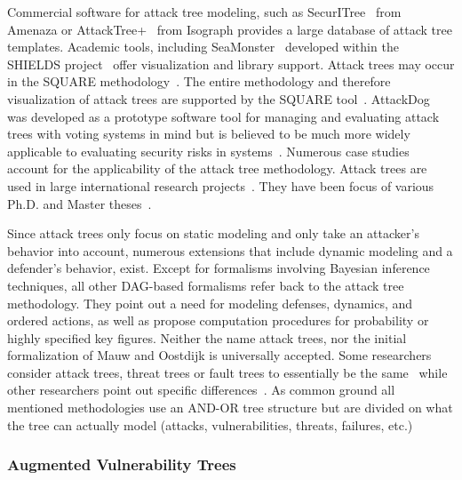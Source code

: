 \documentclass[a4paper]{article}
\begin{document}
Commercial software for attack tree modeling, such as
SecurITree~\cite{Program1} from Amenaza or AttackTree+~\cite{Program2} from
Isograph provides a large database of attack tree templates. Academic tools,
including SeaMonster~\cite{Program6} developed within the SHIELDS
project~\cite{Website_SHIELDS} offer visualization and library support. Attack
trees may occur in the SQUARE methodology~\cite{MeHoSt}. The entire methodology 
and therefore visualization of attack trees are supported by the SQUARE
tool~\cite{Website_Square_Tool}. AttackDog~\cite{Program3} was developed as a
prototype software tool for managing and evaluating attack trees with voting
systems in mind but is believed to be much more widely applicable to evaluating
security risks in systems~\cite{Accurate_Annual_Report}. Numerous case studies
\cite{MoElLi,TiLaFiHa,ByFrMi,CoCoFr,EvHeKyPiWa,HiUnJaSaLu,BuPaUnPaWaSa,FuChWaLeTaAnLi,MeHoSt,AiBoDoFeGeKrLe,KhSe,TeLiGo,ClSiTyHa,GrJo,Mars,NiXiYoSi,PaLeChKiLeKw,ReVeOlCu,SaDuPa,HeApFuRoRuWe,LiZaRuLi,MoMaCaJi,CaKiKi,FeBaMoJi,LaPoDa,LaPoMiDeDa,TeMaLi,EoPaPaCh,LaDiEpHa,MoCaMa,SaWoXu,WaLeRo,SuSv,ZhYu}
account for the applicability of the attack tree methodology. Attack trees are
used in large international research
projects~\cite{Website_EVITA,Website_SHIELDS,trespass,Nucl}.
They have been focus of various Ph.D. and 
Master theses~\cite{Kien,Pumf,Mobe,Fost,Sche,Opel,Karp,Edge,Espe,Hogg,Magi,Harr,Jurg,Piet,Roy,Niel,Ostl,Sameer,Zonouz,Buon,Koot,Pose}.

Since attack trees only focus on static modeling and only take an attacker's
behavior into account, numerous extensions that include dynamic modeling and a
defender's behavior, exist. Except for formalisms involving Bayesian inference
techniques, all other DAG-based formalisms refer back to the attack tree 
methodology.  They point out a need for modeling defenses, dynamics, and ordered
actions,  as well as  propose computation procedures for probability or highly
specified key figures. Neither the name attack trees, nor the initial
formalization of Mauw and Oostdijk is universally accepted. Some researchers
consider attack trees,  threat trees or fault trees to essentially be the 
same~\cite{Lams,MoYa,SoEkNo,Andefirst,Ingo,StSc} while other researchers point 
out specific differences~\cite{LiLiFeHe,MiMu}. As common ground all  mentioned
methodologies use an AND-OR tree structure but are divided on what  the tree can
actually model (attacks, vulnerabilities, threats, failures, etc.) 

\subsubsection{Augmented Vulnerability Trees} 
\label{sec:vulnerability_trees}
\end{document}
